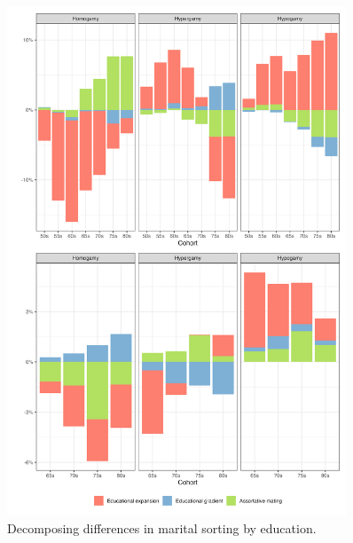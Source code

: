 \begin{figure}[H]
    \centering
    \includegraphics[width=0.9\textwidth]{chapters/chapter4/figures/decomp.png}
    \caption{Decomposing differences in marital sorting by education.}
    \label{fig:decompose}
\end{figure}
